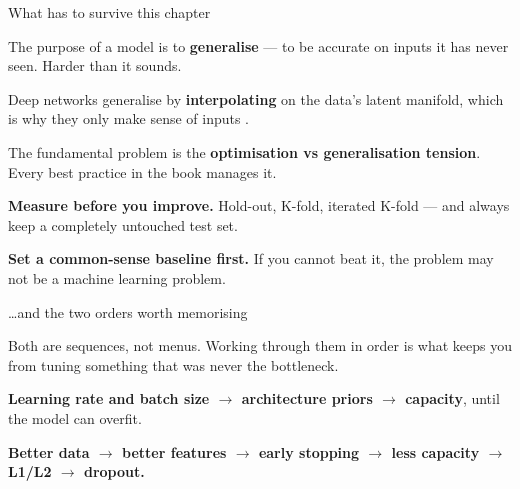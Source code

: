 \documentclass[aspectratio=169,11pt,t]{beamer}
\begin{document}
\begin{frame}[shrink=25]{What has to survive this chapter}
\begin{isteps}
\item The purpose of a model is to \textbf{generalise} --- to be accurate on inputs it has never seen. Harder than it sounds.
\item Deep networks generalise by \textbf{interpolating} on the data's latent manifold, which is why they only make sense of inputs .
\item The fundamental problem is the \textbf{optimisation vs generalisation tension}. Every best practice in the book manages it.
\item \textbf{Measure before you improve.} Hold-out, K-fold, iterated K-fold --- and always keep a completely untouched test set.
\item \textbf{Set a common-sense baseline first.} If you cannot beat it, the problem may not be a machine learning problem.
\end{isteps}
\end{frame}

\begin{frame}[shrink=25]{\ldots{}and the two orders worth memorising}
{\fontsize{9.4}{12.6}\selectfont\color{fg2}Both are sequences, not menus. Working through them in order is what keeps you from tuning something that was never the bottleneck.\par}\vskip 4pt
\begin{minipage}[t]{0.494\textwidth}
\begin{icardaccent}
\textbf{Learning rate and batch size $\rightarrow$ architecture priors $\rightarrow$ capacity}, until the model can overfit.
\end{icardaccent}
\end{minipage}%
\hfill
\begin{minipage}[t]{0.494\textwidth}
\begin{icardaccent}
\textbf{Better data $\rightarrow$ better features $\rightarrow$ early stopping $\rightarrow$ less capacity $\rightarrow$ L1/L2 $\rightarrow$ dropout.}
\end{icardaccent}
\end{minipage}%
\vskip 4pt
\vskip 2pt
\end{frame}
\end{document}
